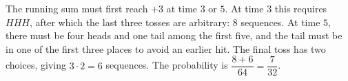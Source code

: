 The running sum must first reach $+3$ at time $3$ or $5$. At time $3$ this requires $HHH$, after which the last three tosses are arbitrary: $8$ sequences. At time $5$, there must be four heads and one tail among the first five, and the tail must be in one of the first three places to avoid an earlier hit. The final toss has two choices, giving $3\cdot2=6$ sequences. The probability is $\dfrac{8+6}{64}=\boxed{\dfrac{7}{32}}$.
